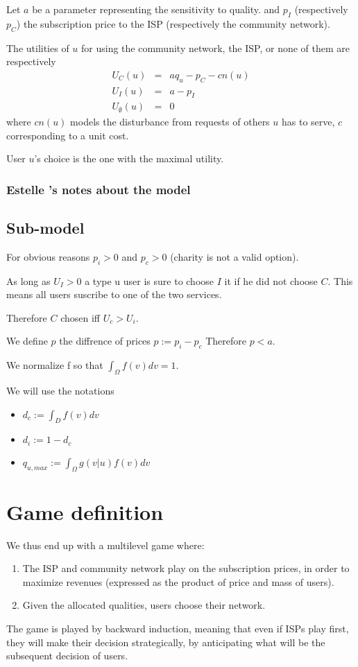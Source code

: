 \documentclass{article}
\begin{document}
Let $a$ be a parameter representing the sensitivity to quality. and $p_{I}$ (respectively $p_C$) the subscription price to the ISP (respectively the community network).
 
 The utilities of $u$ for using the community network, the ISP, or none of them  are respectively
 \begin{eqnarray*}
 U_C(u) & = & a q_u -p_C  - c n(u)\\
 U_I(u) & = & a -p_I \\
 U_\emptyset (u)  & = & 0
 \end{eqnarray*}
 where $c n(u)$ models the disturbance from requests of others $u$ has to serve, $c$ corresponding to a unit cost.
 
 User $u$'s choice is the one with the maximal utility.
 
\subsubsection{Estelle 's notes about the model} 
\subsection{Sub-model}
For obvious reasons $p_i > 0$ and $p_c > 0$ (charity is not a valid option).

As long as $U_I > 0$ a type u user is sure to choose $I$ it if he did not choose $C$.
This means all users suscribe to one of the two services.

Therefore $C$ chosen iff $U_c > U_i$.

We define $p$ the diffrence of prices $p:= p_i - p_c$
Therefore $p < a$.

We normalize f so that $\int_\Omega f(v) dv =1$.

We will use the notations
\begin{itemize}
\item $d_c := \int_D f(v)dv$
\item $d_i := 1 - d_c$
\item $q_{u,max} := \int_\Omega g(v|u) f(v)dv$
\end{itemize} 
 
 
\section{Game definition}
 
 
We thus end up with a multilevel game where:
\begin{enumerate}
\item The ISP and community network play on the subscription prices, in order to maximize revenues (expressed as the product of price and mass of users). 
\item Given the allocated qualities, users choose their network. 
\end{enumerate}
The game is played by backward induction, meaning that even if ISPs play first, they will make their decision strategically, by anticipating what will be the subsequent decision of users.
\end{document}
